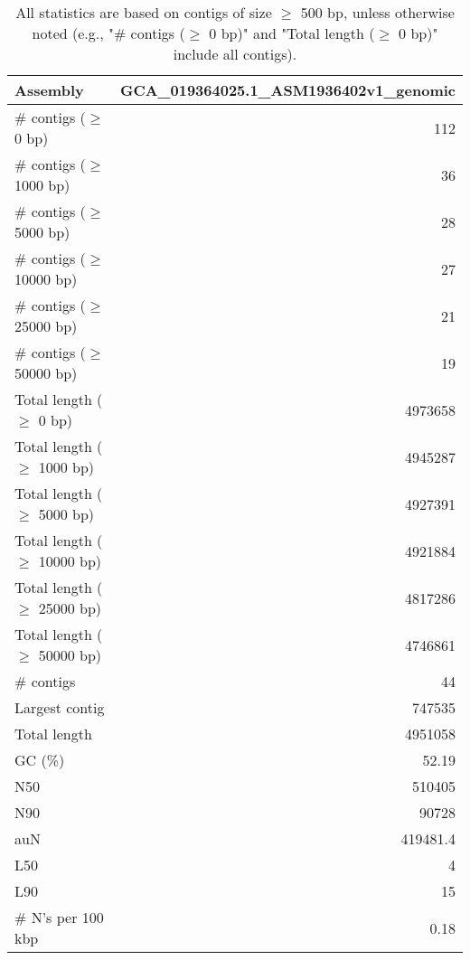 \documentclass[12pt,a4paper]{article}
\begin{document}
\begin{table}[ht]
\begin{center}
\caption{All statistics are based on contigs of size $\geq$ 500 bp, unless otherwise noted (e.g., "\# contigs ($\geq$ 0 bp)" and "Total length ($\geq$ 0 bp)" include all contigs).}
\begin{tabular}{|l*{1}{|r}|}
\hline
Assembly & GCA\_019364025.1\_ASM1936402v1\_genomic \\ \hline
\# contigs ($\geq$ 0 bp) & 112 \\ \hline
\# contigs ($\geq$ 1000 bp) & 36 \\ \hline
\# contigs ($\geq$ 5000 bp) & 28 \\ \hline
\# contigs ($\geq$ 10000 bp) & 27 \\ \hline
\# contigs ($\geq$ 25000 bp) & 21 \\ \hline
\# contigs ($\geq$ 50000 bp) & 19 \\ \hline
Total length ($\geq$ 0 bp) & 4973658 \\ \hline
Total length ($\geq$ 1000 bp) & 4945287 \\ \hline
Total length ($\geq$ 5000 bp) & 4927391 \\ \hline
Total length ($\geq$ 10000 bp) & 4921884 \\ \hline
Total length ($\geq$ 25000 bp) & 4817286 \\ \hline
Total length ($\geq$ 50000 bp) & 4746861 \\ \hline
\# contigs & 44 \\ \hline
Largest contig & 747535 \\ \hline
Total length & 4951058 \\ \hline
GC (\%) & 52.19 \\ \hline
N50 & 510405 \\ \hline
N90 & 90728 \\ \hline
auN & 419481.4 \\ \hline
L50 & 4 \\ \hline
L90 & 15 \\ \hline
\# N's per 100 kbp & 0.18 \\ \hline
\end{tabular}
\end{center}
\end{table}
\end{document}
